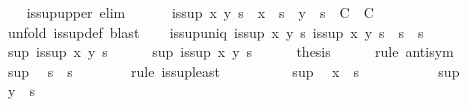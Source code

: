 \begin{isabellebody}
\isanewline
\ \ \isamarkupfalse%
\ is{\isacharunderscore}sup{\isacharunderscore}upper\ {\isacharbrackleft}elim{\isacharquery}{\isacharbrackright}{\isacharcolon}\isanewline
\ \ \ \ \ \ {\isachardoublequoteopen}is{\isacharunderscore}sup\ x\ y\ s\ {\isasymLongrightarrow}\ {\isacharparenleft}x\ {\isasymsqsubseteq}\ s\ {\isasymLongrightarrow}\ y\ {\isasymsqsubseteq}\ s\ {\isasymLongrightarrow}\ C{\isacharparenright}\ {\isasymLongrightarrow}\ C{\isachardoublequoteclose}\isanewline
\ \ \ \ \isamarkupfalse%
\ {\isacharparenleft}unfold\ is{\isacharunderscore}sup{\isacharunderscore}def{\isacharparenright}\ blast%
\endisataginvisible
{\isafoldinvisible}%
%
\isadeliminvisible
\isanewline
%
\endisadeliminvisible
\isanewline
\ \ \isamarkupfalse%
\ is{\isacharunderscore}sup{\isacharunderscore}uniq{\isacharcolon}\ {\isachardoublequoteopen}{\isasymlbrakk}is{\isacharunderscore}sup\ x\ y\ s{\isacharsemicolon}\ is{\isacharunderscore}sup\ x\ y\ s{\isacharprime}{\isasymrbrakk}\ {\isasymLongrightarrow}\ s\ {\isacharequal}\ s{\isacharprime}{\isachardoublequoteclose}\isanewline
%
\isadelimproof
\ \ %
\endisadelimproof
%
\isatagproof
{}\isamarkupfalse%
\ {\isacharminus}\isanewline
\ \ \ \ \isamarkupfalse%
\ sup{\isacharcolon}\ {\isachardoublequoteopen}is{\isacharunderscore}sup\ x\ y\ s{\isachardoublequoteclose}\isanewline
\ \ \ \ \isamarkupfalse%
\ sup{\isacharprime}{\isacharcolon}\ {\isachardoublequoteopen}is{\isacharunderscore}sup\ x\ y\ s{\isacharprime}{\isachardoublequoteclose}\isanewline
\ \ \ \ \isamarkupfalse%
\ {\isacharquery}thesis\isanewline
\ \ \ \ \isamarkupfalse%
\ {\isacharparenleft}rule\ anti{\isacharunderscore}sym{\isacharparenright}\isanewline
\ \ \ \ \ \ \isamarkupfalse%
\ sup\ \isamarkupfalse%
\ {\isachardoublequoteopen}s\ {\isasymsqsubseteq}\ s{\isacharprime}{\isachardoublequoteclose}\isanewline
\ \ \ \ \ \ \isamarkupfalse%
\ {\isacharparenleft}rule\ is{\isacharunderscore}sup{\isacharunderscore}least{\isacharparenright}\isanewline
\ \ \ \ \ \ \ \ \isamarkupfalse%
\ sup{\isacharprime}\ \isamarkupfalse%
\ {\isachardoublequoteopen}x\ {\isasymsqsubseteq}\ s{\isacharprime}{\isachardoublequoteclose}\ \isacommand{{\isachardot}{\isachardot}}\isamarkupfalse%
\isanewline
\ \ \ \ \ \ \ \ \isamarkupfalse%
\ sup{\isacharprime}\ \isamarkupfalse%
\ {\isachardoublequoteopen}y\ {\isasymsqsubseteq}\ s{\isacharprime}{\isachardoublequoteclose}\ \isacommand{{\isachardot}{\isachardot}}\isamarkupfalse%

\end{isabellebody}
